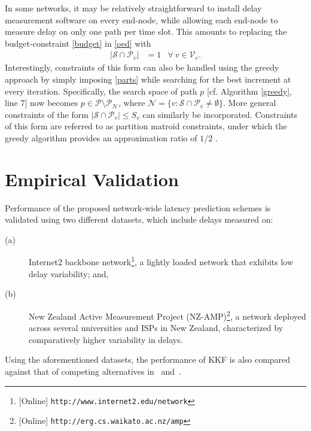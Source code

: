 \documentclass[draftcls,onecolumn,12pt]{IEEEtran}
\providecommand{\abs}[1]{\lvert#1\rvert}												\renewcommand{\b}[1]{\ensuremath{\mathbf{#1}}}		 							\newcommand{\bs}[1]{\ensuremath{\boldsymbol{#1}}}		 						\renewcommand{\c}[1]{\ensuremath{\mathcal{#1}}} 								\newcommand{\E}[1]{\ensuremath{\mathbb{E}\left[#1\right]}} 		  \newcommand{\Es}[1]{\ensuremath{\mathbb{E}^{*}\left[#1\right]}} \newcommand{\ind}{1\hspace{-1.6mm}1}														\newcommand{\norm}[1]{\ensuremath{\left\|#1\right\|}}						\newcommand{\tb}[1]{\ensuremath{\tilde{\mathbf{#1}}}}		 				\newcommand{\mat}[1]{\ensuremath{\begin{bmatrix}#1\end{bmatrix}}}
\def \P {{\c{P}}}
\def \S {{\c{S}}}
\def \N {{\c{N}}}
\theoremstyle{plain}\newtheorem{thm}{Theorem}
\theoremstyle{definition}
\theoremstyle{remark}
\begin{document}
In some networks, it may be relatively straightforward to install delay measurement software on every end-node, while allowing each end-node to measure delay on only one path per time slot.
This amounts to replacing the budget-constraint \eqref{budget} in \eqref{oed} with
\begin{align}
\abs{\S \cap \P_{v}} &= 1 &\forall~v \in \c{V}_e. \label{parts}
\end{align}
Interestingly, constraints of this form can also be handled using the greedy approach by simply imposing \eqref{parts} while searching for the best increment at every iteration.
Specifically, the search space of path $p$ [cf. Algorithm  \ref{greedy}, line 7] now becomes $p \in \P \setminus \P_{\N}$, where $\N=\{v : \S \cap \P_v \neq \emptyset \}$. 
More general constraints of the form $\abs{\S \cap \P_{v}} \leq S_v$ can similarly be incorporated.
Constraints of this form are referred to as partition matroid constraints, under which the greedy algorithm provides an approximation ratio of $1/2$ \cite{fisher}.



\section{Empirical Validation}\label{ev}
Performance of the proposed network-wide latency prediction schemes is validated using two different datasets, which include delays measured on: 
\begin{description}
	\item[(a)] Internet2 backbone network\footnote{[Online] \texttt{http://www.internet2.edu/network}}, a lightly loaded network that exhibits low delay variability; and, 
	\item[(b)] New Zealand Active Measurement Project (NZ-AMP)\footnote{[Online] \texttt{http://erg.cs.waikato.ac.nz/amp}}, a network deployed across several universities and ISPs in New Zealand, characterized by comparatively higher variability in delays.
\end{description}
Using the aforementioned datasets, the performance of KKF is also compared against that of competing alternatives in~\cite{nk} and~\cite{coates}. 
\end{document}
